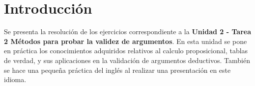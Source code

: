 \section*{Introducci\'on}
	Se presenta la resoluci\'on de los ejercicios correspondiente a la \textbf{Unidad 2 - Tarea 2 M\'etodos para probar la validez de argumentos}. En esta unidad se pone en pr\'actica los conocimientos adquiridos relativos al calculo proposicional, tablas de verdad, y sus aplicaciones en la validaci\'on de argumentos deductivos. Tambi\'en se hace una pequeña pr\'actica del ingl\'es al realizar una presentaci\'on en este idioma.
\newpage